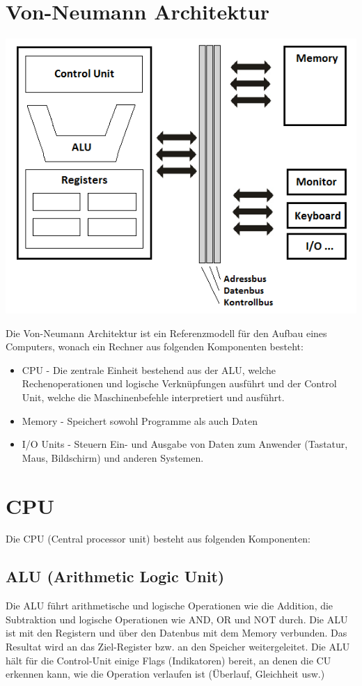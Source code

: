 \documentclass[a4paper,10pt]{report}
\begin{document}
\section{Von-Neumann Architektur}
	\begin{center}
		\includegraphics[scale=0.6]{imgs/VonNeumann.png}
	\end{center}
Die Von-Neumann Architektur ist ein Referenzmodell für den Aufbau eines Computers, wonach ein Rechner aus folgenden Komponenten besteht:
\begin{itemize}
	\item CPU - Die zentrale Einheit bestehend aus der ALU, welche Rechenoperationen und logische Verknüpfungen ausführt und der Control Unit, welche die Maschinenbefehle interpretiert und ausführt.
	\item Memory - Speichert sowohl Programme als auch Daten
	\item I/O Units - Steuern Ein- und Ausgabe von Daten zum Anwender (Tastatur, Maus, Bildschirm) und anderen Systemen.
\end{itemize}
\section{CPU}
Die CPU (Central processor unit) besteht aus folgenden Komponenten:
\subsection{ALU (Arithmetic Logic Unit)}
Die ALU führt arithmetische und logische Operationen wie die Addition, die Subtraktion und logische Operationen wie AND, OR und NOT durch. Die ALU ist mit den Registern und über den Datenbus mit dem Memory verbunden. Das Resultat wird an das Ziel-Register bzw. an den Speicher weitergeleitet. Die ALU hält für die Control-Unit einige Flags (Indikatoren) bereit, an denen die CU erkennen kann, wie die Operation verlaufen ist (Überlauf, Gleichheit usw.)
\end{document}
